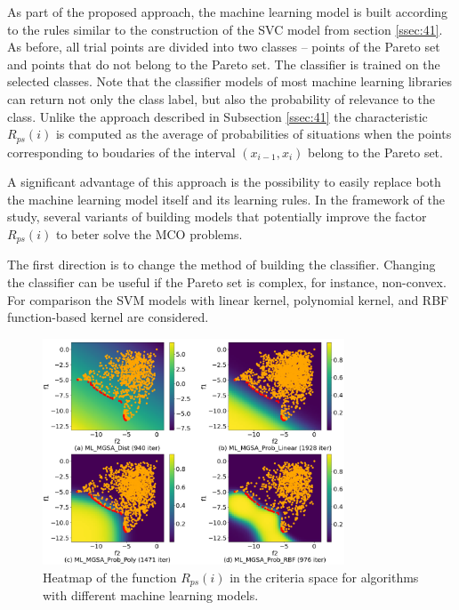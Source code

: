 \documentclass[runningheads]{llncs}
\begin{document}
As part of the proposed approach, the machine learning model is built according to the rules similar to the construction of the SVC model from section \ref{ssec:41}. As before, all trial points are divided into two classes -- points of the Pareto set and points that do not belong to the Pareto set. The classifier is trained on the selected classes. Note that the classifier models of most machine learning libraries can return not only the class label, but also the probability of relevance to the class. Unlike the approach described in Subsection \ref{ssec:41} the characteristic $R_{ps}(i)$ is computed as the average of probabilities of situations when the points
corresponding to boudaries of the interval $(x_{i-1},x_{i})$ belong to the Pareto set.

A significant advantage of this approach is the possibility to easily replace both the machine learning model itself and its learning rules. In the framework of the study, several variants of building models that potentially improve the factor $R_{ps}(i)$ to beter solve the MCO problems.

The first direction is to change the method of building the classifier. Changing the classifier can be useful if the Pareto set is complex, for instance, non-convex.
For comparison the SVM models with linear kernel, polynomial kernel, and RBF function-based kernel are considered.

\begin{figure}[t!]
\centering
\includegraphics[width=0.8\textwidth]{fig1.png}
\caption{Heatmap of the function $R_{ps}(i)$ in the criteria space for algorithms with different machine learning models.} 
\label{fig:1}
\end{figure}
\end{document}
